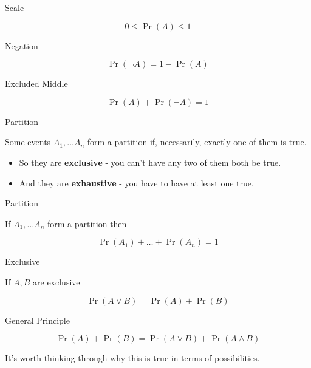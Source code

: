 \documentclass[
  ignorenonframetext,
]{beamer}
\providecommand{\tightlist}{%
  \setlength{\itemsep}{0pt}\setlength{\parskip}{0pt}}
\renewcommand{\,}{\text{, }}
\begin{document}
\begin{frame}{Scale}
\protect\hypertarget{scale}{}

\[
0 \leq \Pr(A) \leq 1
\]

\end{frame}

\begin{frame}{Negation}
\protect\hypertarget{negation}{}

\[
\Pr(\neg A) = 1 - \Pr(A)
\]

\end{frame}

\begin{frame}{Excluded Middle}
\protect\hypertarget{excluded-middle}{}

\[
\Pr(A) + \Pr(\neg A) = 1
\]

\end{frame}

\begin{frame}{Partition}
\protect\hypertarget{partition}{}

Some events \(A_1, \dots A_n\) form a partition if, necessarily, exactly
one of them is true.

\begin{itemize}
\tightlist
\item
  So they are \textbf{exclusive} - you can't have any two of them both
  be true.
\item
  And they are \textbf{exhaustive} - you have to have at least one true.
\end{itemize}

\end{frame}

\begin{frame}{Partition}
\protect\hypertarget{partition-1}{}

If \(A_1, \dots A_n\) form a partition then

\[
\Pr(A_1) + \dots + \Pr(A_n) = 1
\]

\end{frame}

\begin{frame}{Exclusive}
\protect\hypertarget{exclusive}{}

If \(A, B\) are exclusive

\[
\Pr(A \vee B) = \Pr(A) + \Pr(B)
\]

\end{frame}

\begin{frame}{General Principle}
\protect\hypertarget{general-principle}{}

\[
\Pr(A) + \Pr(B) = \Pr(A \vee B) + \Pr(A \wedge B)
\]

\pause

It's worth thinking through why this is true in terms of possibilities.

\end{frame}
\end{document}
